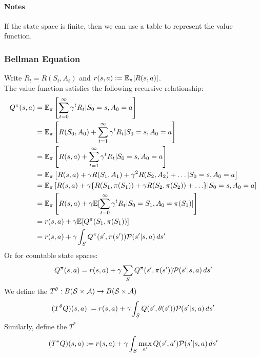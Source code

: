 \documentclass[11pt]{article}
\begin{document}
\paragraph{Notes}
If the state space is finite, then we can use a table to represent the value function.


\subsubsection{Bellman Equation}
Write $R_t = R(S_t, A_t)$ and $r(s,a) := \mathbb{E}_\pi[R(s,a)]$.\\
The value function satisfies the following recursive relationship:
\begin{align}
	Q^\pi(s, a) &= \mathbb{E}_\pi\left[ \sum_{t=0}^\infty \gamma^tR_t|S_0 = s, A_0 = a\right] \\
	&= \mathbb{E}_\pi\left[R(S_0, A_0) + \sum_{t=1}^\infty \gamma^tR_t|S_0 = s, A_0 = a\right] \\
	&= \mathbb{E}_\pi\left[R(s, a) + \sum_{t=1}^\infty \gamma^tR_t|S_0 = s, A_0 = a\right] \\
	&= \mathbb{E}_\pi\left[ R(s, a) + \gamma R(S_1, A_1) + \gamma^2R(S_2, A_2) + \hdots|S_0=s, A_0=a\right]\\
	&= \mathbb{E}_\pi\left[ R(s, a) + \gamma\{R(S_1, \pi(S_1)) + \gamma R(S_2, \pi(S_2)) + \hdots\}|S_0=s, A_0=a\right]\\
	&= \mathbb{E}_\pi\left[ R(s, a) + \gamma\mathbb{E}[\sum_{t=0}^\infty\gamma^tR_{t}|S_0=S_1, A_0=\pi(S_1)]\right]\\
	&= r(s,a) + \gamma  \mathbb{E}[Q^\pi(S_1, \pi(S_1))] \\
	&= r(s,a) + \gamma \int_S Q^\pi(s', \pi(s'))\mathcal{P}(s'|s,a)\,ds'
\end{align}
Or for countable state spaces:
$$Q^\pi(s, a) = r(s,a) + \gamma \sum_S Q^\pi(s', \pi(s'))\mathcal{P}(s'|s,a)\,ds'$$
We define the  $T^\theta: B(\mathcal{S} \times \mathcal{A}) \rightarrow B(\mathcal{S} \times \mathcal{A})$
$$(T^\theta Q)(s,a) := r(s,a) + \gamma \int_S Q(s', \theta(s'))\mathcal{P}(s'|s,a)\,ds'$$
Similarly, define the  $T^*$
$$(T^* Q)(s,a) := r(s,a) + \gamma \int_S\underset{a'}{\max}\,Q(s', a')\mathcal{P}(s'|s,a)\,ds'$$
\end{document}

